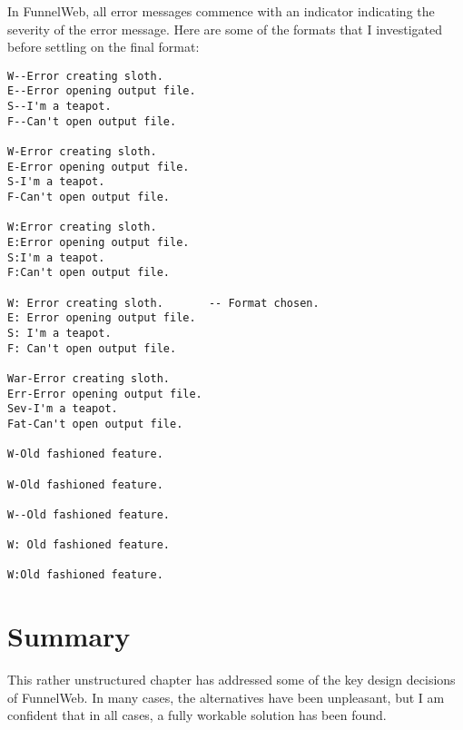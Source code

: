 In FunnelWeb, all error messages commence with an indicator indicating
the severity of the error message. Here are some of the formats that
I investigated before settling on the final format:

\begin{verbatim}
W--Error creating sloth.
E--Error opening output file.
S--I'm a teapot.
F--Can't open output file.

W-Error creating sloth.
E-Error opening output file.
S-I'm a teapot.
F-Can't open output file.

W:Error creating sloth.
E:Error opening output file.
S:I'm a teapot.
F:Can't open output file.

W: Error creating sloth.       -- Format chosen.
E: Error opening output file.
S: I'm a teapot.
F: Can't open output file.

War-Error creating sloth.
Err-Error opening output file.
Sev-I'm a teapot.
Fat-Can't open output file.

W-Old fashioned feature.

W-Old fashioned feature.

W--Old fashioned feature.

W: Old fashioned feature.

W:Old fashioned feature.
\end{verbatim}

\section{Summary}

This rather unstructured chapter has addressed some of the key design
decisions of FunnelWeb. In many cases, the alternatives have been
unpleasant, but I am confident that in all cases, a fully workable solution
has been found.

